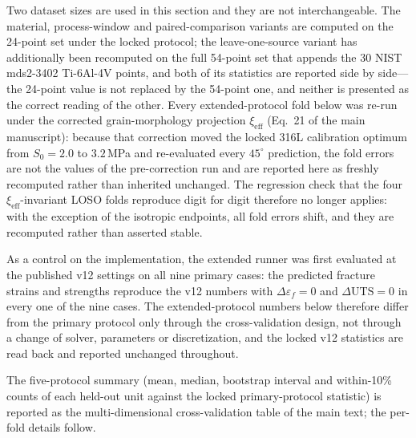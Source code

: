 \documentclass[12pt,a4paper,twocolumn]{article}
\providecommand{\ang}[1]{\ensuremath{#1^{\circ}}}
\begin{document}
Two dataset sizes are used in this section and they are not interchangeable. The material, process-window and paired-comparison variants are computed on the 24-point set under the locked protocol; the leave-one-source variant has additionally been recomputed on the full 54-point set that appends the 30 NIST mds2-3402 Ti-6Al-4V points, and both of its statistics are reported side by side---the 24-point value is not replaced by the 54-point one, and neither is presented as the correct reading of the other. Every extended-protocol fold below was re-run under the corrected grain-morphology projection $\xi_{\mathrm{eff}}$ (Eq.~21 of the main manuscript): because that correction moved the locked 316L calibration optimum from $S_0 = 2.0$ to $3.2$\,MPa and re-evaluated every $\ang{45}$ prediction, the fold errors are not the values of the pre-correction run and are reported here as freshly recomputed rather than inherited unchanged. The regression check that the four $\xi_{\mathrm{eff}}$-invariant LOSO folds reproduce digit for digit therefore no longer applies: with the exception of the isotropic endpoints, all fold errors shift, and they are recomputed rather than asserted stable.

As a control on the implementation, the extended runner was first evaluated at the published v12 settings
on all nine primary cases: the predicted fracture strains and strengths reproduce the v12 numbers with
$\Delta\varepsilon_f = 0$ and $\Delta\mathrm{UTS} = 0$ in every one of the nine cases. The
extended-protocol numbers below therefore differ from the primary protocol only through the
cross-validation design, not through a change of solver, parameters or discretization, and the locked v12
statistics are read back and reported unchanged throughout.

The five-protocol summary (mean, median, bootstrap interval and within-10\% counts of each held-out unit against the locked primary-protocol statistic) is reported as the multi-dimensional cross-validation table of the main text; the per-fold details follow.
\end{document}
